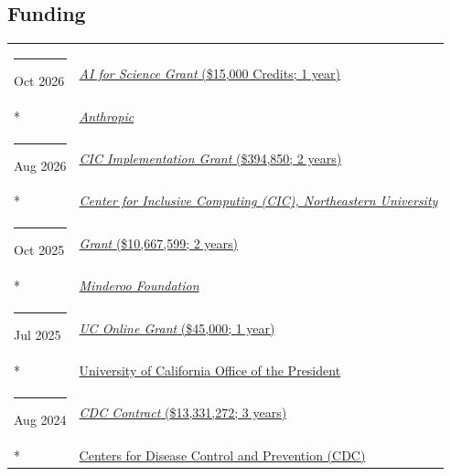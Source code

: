 \documentclass[margin,line]{res}
\begin{document}
\begin{resume}
\section{\sc Funding}
\begin{longtable}{@{}p{0.7in}p{4in}}
\hspace*{-4mm} \rule{-1mm}{5mm} Oct 2026 & \href{https://www.anthropic.com/news/ai-for-science-program}{\textit{AI for Science Grant} (\$15,000 Credits; 1 year)}\\*
\hspace*{-4mm} \hspace*{-4mm} & \hspace{4mm} \href{https://www.anthropic.com/}{\textit{Anthropic}}\\
\hspace*{-4mm} \rule{-1mm}{5mm} Aug 2026 & \href{https://cic.northeastern.edu/}{\textit{CIC Implementation Grant} (\$394,850; 2 years)}\\*
\hspace*{-4mm} \hspace*{-4mm} & \hspace{4mm} \href{https://cic.northeastern.edu/}{\textit{Center for Inclusive Computing (CIC), Northeastern University}}\\
\hspace*{-4mm} \rule{-1mm}{5mm} Oct 2025 & \href{https://www.minderoo.org}{\textit{Grant} (\$10,667,599; 2 years)}\\*
\hspace*{-4mm} \hspace*{-4mm} & \hspace{4mm} \href{https://www.minderoo.org}{\textit{Minderoo Foundation}}\\
\hspace*{-4mm} \rule{-1mm}{5mm} Jul 2025 & \href{https://www.ucop.edu/uc-online/index.html}{\textit{UC Online Grant} (\$45,000; 1 year)}\\*
\hspace*{-4mm} \hspace*{-4mm} & \hspace{4mm} \href{https://www.ucop.edu/}{University of California Office of the President}\\
\hspace*{-4mm} \rule{-1mm}{5mm} Aug 2024 & \href{https://www.cdc.gov}{\textit{CDC Contract} (\$13,331,272; 3 years)}\\*
\hspace*{-4mm} \hspace*{-4mm} & \hspace{4mm} \href{https://www.cdc.gov/}{Centers for Disease Control and Prevention (CDC)}\\

\end{longtable}
\end{resume}
\end{document}
